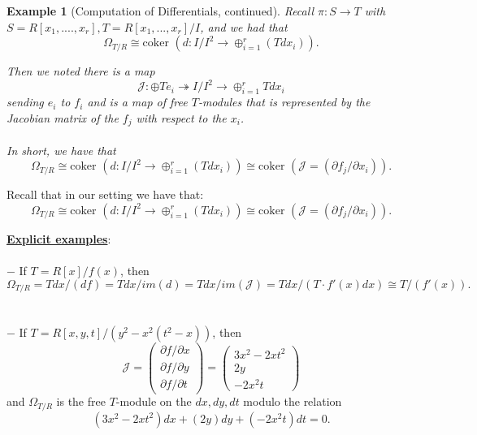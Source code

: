 \documentclass{beamer}
\newtheorem{ex}{Example}
\begin{document}
\begin{frame}
\begin{small}

\begin{ex}[Computation of Differentials, continued]
Recall $\pi:S\to T$ with $S = R[x_1,....,x_r], T = R[x_1,...,x_r]/I$, and we had that 
$$\Omega_{T/R}\cong \text{coker }(d:I/I^2\to \oplus_{i=1}^r(Tdx_i)).$$

Then we noted there is a map
$$\mathcal{J}:\oplus Te_i\twoheadrightarrow I/I^2\to\oplus_{i=1}^rTdx_i$$ sending $e_i$ to $f_i$ and is a map of free $T$-modules that is represented by the Jacobian matrix of the $f_j$ with respect to the $x_i$.
\\\indent
\\In short, we have that 
$$\Omega_{T/R}\cong \text{coker }(d:I/I^2\to \oplus_{i=1}^r(Tdx_i)) \cong \text{coker }(\mathcal{J} = (\partial f_j/\partial x_i)).$$

\end{ex}


\end{small}
\end{frame}




\begin{frame}
\begin{small}
Recall that in our setting we have that: 
$$\Omega_{T/R}\cong \text{coker }(d:I/I^2\to \oplus_{i=1}^r(Tdx_i)) \cong \text{coker }(\mathcal{J} = (\partial f_j/\partial x_i)).$$

\underline{\textbf{Explicit examples}}: 
\\\indent 
\\$-$ If $T = R[x]/f(x)$, then 
$$\Omega_{T/R} = Tdx/(df) =  Tdx/im(d) = Tdx/im(\mathcal{J}) = Tdx/(T\cdot f'(x)dx)\cong T/(f'(x)).$$
\\\indent
\\$-$ If $T = R[x,y,t]/(y^2-x^2(t^2-x))$, then 
\\$$\mathcal{J} = 
\begin{pmatrix}
\partial f/\partial x\\
\partial f/\partial y\\
\partial f/\partial t
\end{pmatrix}
 = 
 \begin{pmatrix}
3x^2-2xt^2\\
2y\\
-2x^2t
\end{pmatrix}$$
and $\Omega_{T/R}$ is the free $T$-module on the $dx,dy,dt$ modulo the relation
$$(3x^2-2xt^2)dx + (2y)dy + (-2x^2t)dt = 0.$$

\end{small}
\end{frame}
\end{document}
